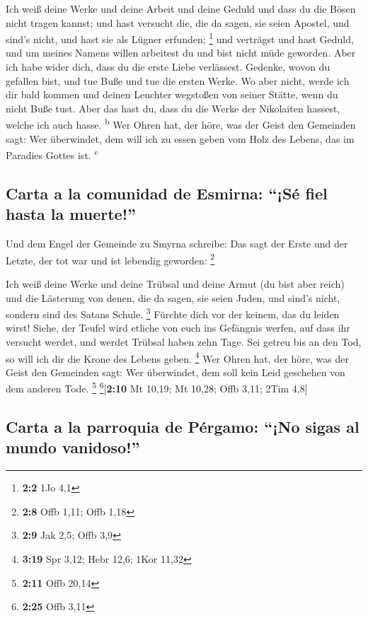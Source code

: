  Ich weiß deine Werke und deine Arbeit und deine Geduld
und dass du die Bösen nicht tragen kannst; und hast versucht die, die da
sagen, sie seien Apostel, und sind's nicht, und hast sie als Lügner
erfunden; \footnote{\textbf{2:2} 1Jo 4,1}  und verträgst
und hast Geduld, und um meines Namens willen arbeitest du und bist nicht
müde geworden.  Aber ich habe wider dich, dass du die
erste Liebe verlässest.  Gedenke, wovon du gefallen bist,
und tue Buße und tue die ersten Werke. Wo aber nicht, werde ich dir bald
kommen und deinen Leuchter wegstoßen von seiner Stätte, wenn du nicht
Buße tust.  Aber das hast du, dass du die Werke der
Nikolaiten hassest, welche ich auch hasse. \textsuperscript{b}
 Wer Ohren hat, der höre, was der Geist den Gemeinden
sagt: Wer überwindet, dem will ich zu essen geben vom Holz des Lebens,
das im Paradies Gottes ist. \textsuperscript{c}

\hypertarget{carta-a-la-comunidad-de-esmirna-suxe9-fiel-hasta-la-muerte}{%
\subsection{Carta a la comunidad de Esmirna: ``¡Sé fiel hasta la
muerte!''}\label{carta-a-la-comunidad-de-esmirna-suxe9-fiel-hasta-la-muerte}}

 Und dem Engel der Gemeinde zu Smyrna schreibe: Das sagt
der Erste und der Letzte, der tot war und ist lebendig geworden:
\footnote{\textbf{2:8} Offb 1,11; Offb 1,18}

 Ich weiß deine Werke und deine Trübsal und deine Armut
(du bist aber reich) und die Lästerung von denen, die da sagen, sie
seien Juden, und sind's nicht, sondern sind des Satans Schule.
\footnote{\textbf{2:9} Jak 2,5; Offb 3,9}  Fürchte dich
vor der keinem, das du leiden wirst! Siehe, der Teufel wird etliche von
euch ins Gefängnis werfen, auf dass ihr versucht werdet, und werdet
Trübsal haben zehn Tage. Sei getreu bis an den Tod, so will ich dir die
Krone des Lebens geben. \footnote{\textbf{3:19} Spr 3,12; Hebr 12,6;
  1Kor 11,32}  Wer Ohren hat, der höre, was der Geist den
Gemeinden sagt: Wer überwindet, dem soll kein Leid geschehen von dem
anderen Tode. \footnote{\textbf{2:11} Offb 20,14}
\footnote{\textbf{2:25} Offb 3,11}{[}\textbf{2:10} Mt 10,19; Mt 10,28;
Offb 3,11; 2Tim 4,8{]}

\hypertarget{carta-a-la-parroquia-de-puxe9rgamo-no-sigas-al-mundo-vanidoso}{%
\subsection{Carta a la parroquia de Pérgamo: ``¡No sigas al mundo
vanidoso!''}\label{carta-a-la-parroquia-de-puxe9rgamo-no-sigas-al-mundo-vanidoso}}

